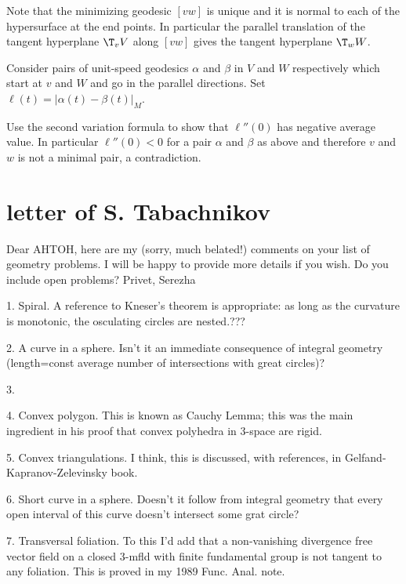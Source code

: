 Note that the minimizing geodesic $[vw]$ is unique and it is normal to each of the hypersurface at the end points.
In particular the parallel translation of the tangent hyperplane $\T_vV$ along $[vw]$ gives the tangent hyperplane $\T_wW$.

Consider pairs of unit-speed geodesics $\alpha$ and $\beta$ 
in $V$ and $W$ respectively 
which start at $v$ and $W$ and go in the parallel directions. 
Set $\ell(t)=|\alpha(t)-\beta(t)|_M$.

Use the second variation formula to show that $\ell''(0)$ has negative average value. 
In particular $\ell''(0)<0$ for a pair $\alpha$ and $\beta$ as above
and therefore  $v$ and $w$ is not a minimal pair, a contradiction.



















\chapter{letter of S. Tabachnikov}

Dear AHTOH, here are my (sorry, much belated!) comments on your list
of geometry problems. I will be happy to provide more details if you
wish. Do you include open problems? Privet, Serezha

1. Spiral. A reference to Kneser's theorem is appropriate: as long as
the curvature is monotonic, the osculating circles are nested.???

2. A curve in a sphere. Isn't it an immediate consequence of integral
geometry (length=const \times average number of intersections with
great circles)?

3.

4. Convex polygon. This is known as Cauchy Lemma; this was the main
ingredient in his proof that convex polyhedra in 3-space are rigid.

5. Convex triangulations. I think, this is discussed, with
references, in Gelfand-Kapranov-Zelevinsky book.

6. Short curve in a sphere. Doesn't it follow from integral geometry
that every open interval of this curve doesn't intersect some grat
circle?

7. Transversal foliation. To this I'd add that a non-vanishing
divergence free vector field on a closed 3-mfld with finite
fundamental group is not tangent to any foliation. This is proved in
my 1989 Func. Anal. note.

